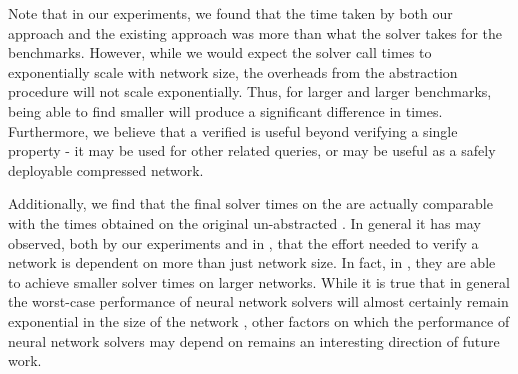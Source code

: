 Note that in our experiments, we found that the time taken by both our \cegar
approach and the existing \cegar approach \cite{cegar-nn} was more than what the
\neuralsat solver takes for the \acasxu benchmarks. However, while we would
expect the solver call times to exponentially scale with network size, the
overheads from the abstraction procedure will not scale exponentially. Thus, for
larger and larger benchmarks, being able to find smaller \abs will produce a
significant difference in times. Furthermore, we believe that a verified \abs is
useful beyond verifying a single property - it may be used for other related
queries, or may be useful as a safely deployable compressed network.

Additionally, we find that the final solver times on the \abs are actually
comparable with the times obtained on the original un-abstracted \cnc. In
general it has may observed, both by our experiments and in \cite{cegar-nn},
that the effort needed to verify a network is dependent
on more than just network size. In fact, in \cite{cegar-nn},
they are able to achieve smaller solver times on larger networks. 
While it is true that in general the worst-case performance of neural network
solvers will almost certainly remain exponential in the size of the network
\cite{reluplex}, other factors on which the performance of neural network
solvers may depend on remains an interesting direction of future work. 

